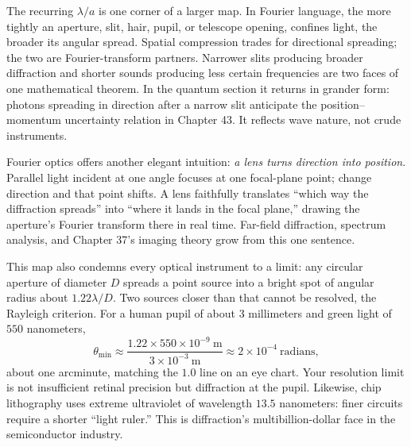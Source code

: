 \begin{challenge}
The recurring \(\lambda/a\) is one corner of a larger map. In Fourier language, the more tightly an aperture, slit, hair, pupil, or telescope opening, confines light, the broader its angular spread. Spatial compression trades for directional spreading; the two are Fourier-transform partners. Narrower slits producing broader diffraction and shorter sounds producing less certain frequencies are two faces of one mathematical theorem. In the quantum section it returns in grander form: photons spreading in direction after a narrow slit anticipate the position--momentum uncertainty relation in Chapter 43. It reflects wave nature, not crude instruments.

Fourier optics offers another elegant intuition: \emph{a lens turns direction into position}. Parallel light incident at one angle focuses at one focal-plane point; change direction and that point shifts. A lens faithfully translates ``which way the diffraction spreads'' into ``where it lands in the focal plane,'' drawing the aperture's Fourier transform there in real time. Far-field diffraction, spectrum analysis, and Chapter 37's imaging theory grow from this one sentence.

This map also condemns every optical instrument to a limit: any circular aperture of diameter \(D\) spreads a point source into a bright spot of angular radius about \(1.22\lambda/D\). Two sources closer than that cannot be resolved, the Rayleigh criterion. For a human pupil of about \(3\) millimeters and green light of \(550\) nanometers,
\[
  \theta_{\min} \approx \frac{1.22\times 550\times10^{-9}\ \text{m}}{3\times10^{-3}\ \text{m}}
  \approx 2\times10^{-4}\ \text{radians},
\]
about one arcminute, matching the \(1.0\) line on an eye chart. Your resolution limit is not insufficient retinal precision but diffraction at the pupil. Likewise, chip lithography uses extreme ultraviolet of wavelength \(13.5\) nanometers: finer circuits require a shorter ``light ruler.'' This is diffraction's multibillion-dollar face in the semiconductor industry.
\end{challenge}



